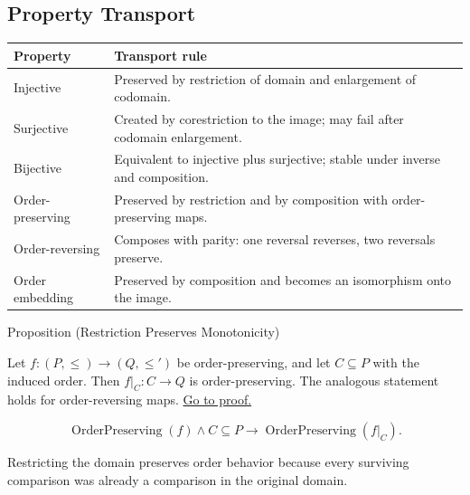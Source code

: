 
\subsection*{Property Transport}

\begin{remark*}
\small
\begin{tabularx}{\textwidth}{l X}
\toprule
\textbf{Property} & \textbf{Transport rule} \\
\midrule
Injective & Preserved by restriction of domain and enlargement of codomain. \\
Surjective & Created by corestriction to the image; may fail after codomain enlargement. \\
Bijective & Equivalent to injective plus surjective; stable under inverse and composition. \\
Order-preserving & Preserved by restriction and by composition with order-preserving maps. \\
Order-reversing & Composes with parity: one reversal reverses, two reversals preserve. \\
Order embedding & Preserved by composition and becomes an isomorphism onto the image. \\
\bottomrule
\end{tabularx}
\end{remark*}

\begin{propositionbox}{Proposition (Restriction Preserves Monotonicity)}
\begin{proposition}\label{prop:restriction-preserves-monotonicity}
Let $f:(P,\leq)\to(Q,\leq')$ be order-preserving, and let $C\subseteq P$
with the induced order. Then $f|_C:C\to Q$ is order-preserving. The analogous
statement holds for order-reversing maps.
\hyperref[prf:restriction-preserves-monotonicity]{Go to proof.}
\end{proposition}
\end{propositionbox}

\begin{remark*}
\[
  \operatorname{OrderPreserving}(f)\wedge C\subseteq P
  \to
  \operatorname{OrderPreserving}(f|_C).
\]
\end{remark*}

\begin{remark*}[Interpretation]
Restricting the domain preserves order behavior because every surviving
comparison was already a comparison in the original domain.
\end{remark*}

